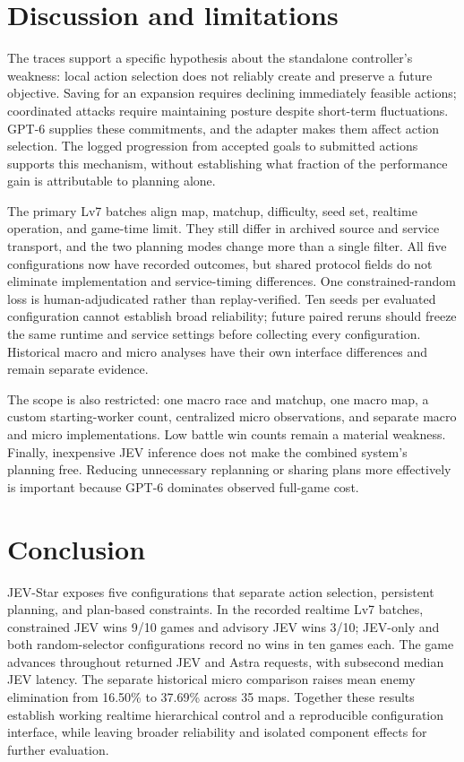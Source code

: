 \documentclass{article}
\begin{document}
\section{Discussion and limitations}

The traces support a specific hypothesis about the standalone controller's weakness: local action selection does not reliably create and preserve a future objective. Saving for an expansion requires declining immediately feasible actions; coordinated attacks require maintaining posture despite short-term fluctuations. GPT-6 supplies these commitments, and the adapter makes them affect action selection. The logged progression from accepted goals to submitted actions supports this mechanism, without establishing what fraction of the performance gain is attributable to planning alone.

The primary Lv7 batches align map, matchup, difficulty, seed set, realtime operation, and game-time limit. They still differ in archived source and service transport, and the two planning modes change more than a single filter. All five configurations now have recorded outcomes, but shared protocol fields do not eliminate implementation and service-timing differences. One constrained-random loss is human-adjudicated rather than replay-verified. Ten seeds per evaluated configuration cannot establish broad reliability; future paired reruns should freeze the same runtime and service settings before collecting every configuration. Historical macro and micro analyses have their own interface differences and remain separate evidence.

The scope is also restricted: one macro race and matchup, one macro map, a custom starting-worker count, centralized micro observations, and separate macro and micro implementations. Low battle win counts remain a material weakness. Finally, inexpensive JEV inference does not make the combined system's planning free. Reducing unnecessary replanning or sharing plans more effectively is important because GPT-6 dominates observed full-game cost.

\section{Conclusion}

JEV-Star exposes five configurations that separate action selection, persistent planning, and plan-based constraints. In the recorded realtime Lv7 batches, constrained JEV wins 9/10 games and advisory JEV wins 3/10; JEV-only and both random-selector configurations record no wins in ten games each. The game advances throughout returned JEV and Astra requests, with subsecond median JEV latency. The separate historical micro comparison raises mean enemy elimination from 16.50\% to 37.69\% across 35 maps. Together these results establish working realtime hierarchical control and a reproducible configuration interface, while leaving broader reliability and isolated component effects for further evaluation.
\end{document}
